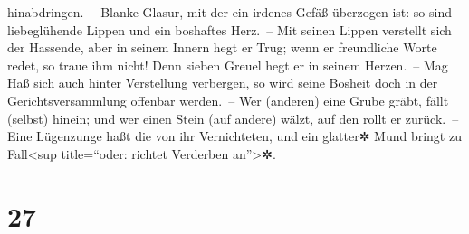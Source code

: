 hinabdringen.~-- Blanke Glasur, mit der ein irdenes Gefäß
überzogen ist: so sind liebeglühende Lippen und ein boshaftes Herz.~--
Mit seinen Lippen verstellt sich der Hassende, aber in
seinem Innern hegt er Trug; wenn er freundliche Worte
redet, so traue ihm nicht! Denn sieben Greuel hegt er in seinem
Herzen.~-- Mag Haß sich auch hinter Verstellung
verbergen, so wird seine Bosheit doch in der Gerichtsversammlung
offenbar werden.~-- Wer (anderen) eine Grube gräbt, fällt
(selbst) hinein; und wer einen Stein (auf andere) wälzt, auf den rollt
er zurück.~-- Eine Lügenzunge haßt die von ihr
Vernichteten, und ein glatter✲ Mund bringt zu Fall\textless sup
title=``oder: richtet Verderben an''\textgreater✲.

\hypertarget{section-26}{%
\section{27}\label{section-26}}

